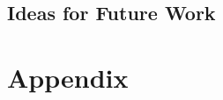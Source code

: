 \documentclass[12pt]{report}
\begin{document}


\lipsum[2-4]



\section{Ideas for Future Work}















%














\appendix

\chapter{Appendix}

\lipsum[2-3]
\end{document}
